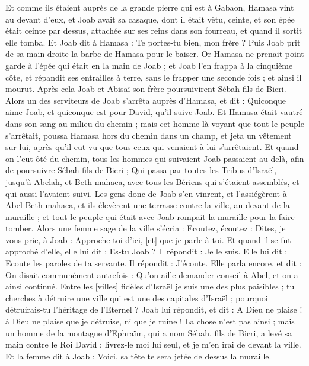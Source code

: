 \begin{multicols}{2}
Et comme ils étaient auprès de la grande pierre qui est à Gabaon, Hamasa vint au devant d'eux, et Joab avait sa casaque, dont il était vêtu, ceinte, et son épée était ceinte par dessus, attachée sur ses reins dans son fourreau, et quand il sortit elle tomba.
Et Joab dit à Hamasa : Te portes-tu bien, mon frère ? Puis Joab prit de sa main droite la barbe de Hamasa pour le baiser.
Or Hamasa ne prenait point garde à l'épée qui était en la main de Joab ; et Joab l'en frappa à la cinquième côte, et répandit ses entrailles à terre, sans le frapper une seconde fois ; et ainsi il mourut. Après cela Joab et Abisaï son frère poursuivirent Sébah fils de Bicri.
Alors un des serviteurs de Joab s'arrêta auprès d'Hamasa, et dit : Quiconque aime Joab, et quiconque est pour David, qu'il suive Joab.
Et Hamasa était vautré dans son sang au milieu du chemin ; mais cet homme-là voyant que tout le peuple s'arrêtait, poussa Hamasa hors du chemin dans un champ, et jeta un vêtement sur lui, après qu'il eut vu que tous ceux qui venaient à lui s'arrêtaient.
Et quand on l'eut ôté du chemin, tous les hommes qui suivaient Joab passaient au delà, afin de poursuivre Sébah fils de Bicri ;
Qui passa par toutes les Tribus d'Israël, jusqu'à Abelah, et Beth-mahaca, avec tous les Bériens qui s'étaient assemblés, et qui aussi l'avaient suivi.
Les gens donc de Joab s'en vinrent, et l'assiégèrent à Abel Beth-mahaca, et ils élevèrent une terrasse contre la ville, au devant de la muraille ; et tout le peuple qui était avec Joab rompait la muraille pour la faire tomber.
Alors une femme sage de la ville s'écria : Ecoutez, écoutez : Dites, je vous prie, à Joab : Approche-toi d'ici, [et] que je parle à toi.
Et quand il se fut approché d'elle, elle lui dit : Es-tu Joab ? Il répondit : Je le suis. Elle lui dit : Ecoute les paroles de ta servante. Il répondit : J'écoute.
Elle parla encore, et dit : On disait communément autrefois : Qu'on aille demander conseil à Abel, et on a ainsi continué.
Entre les [villes] fidèles d'Israël je suis une des plus paisibles ; tu cherches à détruire une ville qui est une des capitales d'Israël ; pourquoi détruirais-tu l'héritage de l'Eternel ?
Joab lui répondit, et dit : A Dieu ne plaise ! à Dieu ne plaise que je détruise, ni que je ruine !
La chose n'est pas ainsi ; mais un homme de la montagne d'Ephraïm, qui a nom Sébah, fils de Bicri, a levé sa main contre le Roi David ; livrez-le moi lui seul, et je m'en irai de devant la ville. Et la femme dit à Joab : Voici, sa tête te sera jetée de dessus la muraille.

\end{multicols}
